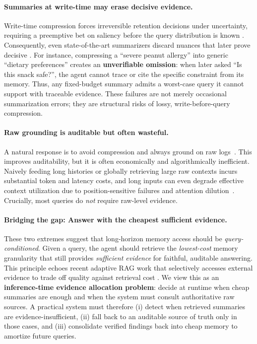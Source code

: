 \documentclass{article}
\theoremstyle{plain}
\theoremstyle{definition}
\theoremstyle{remark}
\begin{document}
\paragraph{Summaries at write-time may erase decisive evidence.}
Write-time compression forces irreversible retention decisions under uncertainty, requiring a preemptive bet on saliency before the query distribution is known \cite{zheng2025goaldirected}.
Consequently, even state-of-the-art summarizers discard nuances that later prove decisive \cite{kang2025acon}.
For instance, compressing a ``severe peanut allergy'' into generic ``dietary preferences'' creates an \textbf{unverifiable omission}: when later asked ``Is this snack safe?'', the agent cannot trace or cite the specific constraint from its memory.
Thus, any fixed-budget summary admits a worst-case query it cannot support with traceable evidence. These failures are not merely occasional summarization errors; they are structural risks of lossy, write-before-query compression.

\paragraph{Raw grounding is auditable but often wasteful.}
A natural response is to avoid compression and always ground on raw logs~\citep{asai_self-rag_2023,yan_general_2025,du_memr3_2025}.
This improves auditability, but it is often economically and algorithmically inefficient.
Naively feeding long histories or globally retrieving large raw contexts incurs substantial token and latency costs, and long inputs can even degrade effective context utilization due to position-sensitive failures and attention dilution~\citep{liu_lost_2023,zhang_recursive_2025}.
Crucially, most queries do \emph{not} require raw-level evidence.

\paragraph{Bridging the gap: Answer with the cheapest sufficient evidence.}
These two extremes suggest that long-horizon memory access should be \emph{query-conditioned}.
Given a query, the agent should retrieve the \emph{lowest-cost} memory granularity that still provides \emph{sufficient evidence} for faithful, auditable answering. This principle echoes recent adaptive RAG work that selectively accesses external evidence to trade off quality against retrieval cost \cite{su2025fastorbetter,wang2025targ}.
We view this as an \textbf{inference-time evidence allocation problem}: decide at runtime when cheap summaries are enough and when the system must consult authoritative raw sources.
A practical system must therefore (i) detect when retrieved summaries are evidence-insufficient, (ii) fall back to an auditable source of truth only in those cases, and (iii) consolidate verified findings back into cheap memory to amortize future queries.
\end{document}
